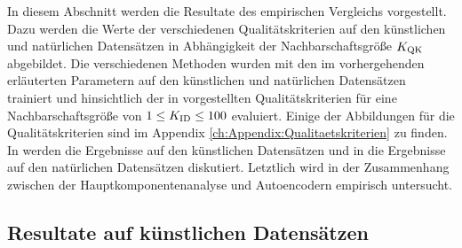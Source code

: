 In diesem Abschnitt werden die Resultate des empirischen Vergleichs vorgestellt. Dazu werden die
Werte der verschiedenen Qualitätskriterien auf den künstlichen und natürlichen Datensätzen in
Abhängigkeit der Nachbarschaftsgröße $K_{\text{QK}}$ abgebildet. Die verschiedenen Methoden wurden mit den
im vorhergehenden  erläuterten Parametern
auf den künstlichen und natürlichen Datensätzen trainiert und hinsichtlich der in
 vorgestellten Qualitätskriterien für
eine Nachbarschaftsgröße von $1 \leq K_{\text{ID}} \leq 100$ evaluiert. Einige der Abbildungen für die
Qualitätskriterien sind im Appendix \ref{ch:Appendix:Qualitaetskriterien} zu finden. In
 werden die Ergebnisse auf den künstlichen
Datensätzen und in  die Ergebnisse auf den
natürlichen Datensätzen diskutiert. Letztlich wird in 
der Zusammenhang zwischen der Hauptkomponentenanalyse und Autoencodern empirisch untersucht.

\subsection{Resultate auf künstlichen Datensätzen}
\label{ch:Vergleich:sec:Resultate:kuenstlich}

